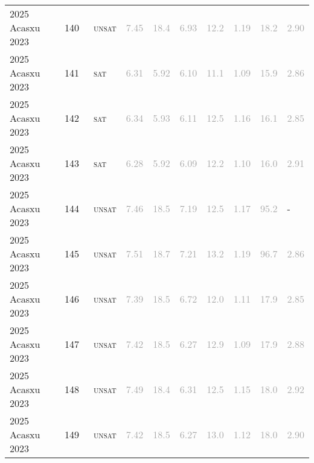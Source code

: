\begin{center}
{\begin{longtable}{@{}llllllllll@{}}
2025 Acasxu 2023 & 140 & ~\textsc{unsat} & \textcolor{darkgray}{7.45} & \textcolor{darkgray}{18.4} & \textcolor{darkgray}{6.93} & \textcolor{darkgray}{12.2} & \textcolor{darkgray}{1.19} & \textcolor{darkgray}{18.2} & \textcolor{darkgray}{2.90} \\
2025 Acasxu 2023 & 141 & ~\textsc{sat} & \textcolor{darkgray}{6.31} & \textcolor{darkgray}{5.92} & \textcolor{darkgray}{6.10} & \textcolor{darkgray}{11.1} & \textcolor{darkgray}{1.09} & \textcolor{darkgray}{15.9} & \textcolor{darkgray}{2.86} \\
2025 Acasxu 2023 & 142 & ~\textsc{sat} & \textcolor{darkgray}{6.34} & \textcolor{darkgray}{5.93} & \textcolor{darkgray}{6.11} & \textcolor{darkgray}{12.5} & \textcolor{darkgray}{1.16} & \textcolor{darkgray}{16.1} & \textcolor{darkgray}{2.85} \\
2025 Acasxu 2023 & 143 & ~\textsc{sat} & \textcolor{darkgray}{6.28} & \textcolor{darkgray}{5.92} & \textcolor{darkgray}{6.09} & \textcolor{darkgray}{12.2} & \textcolor{darkgray}{1.10} & \textcolor{darkgray}{16.0} & \textcolor{darkgray}{2.91} \\
2025 Acasxu 2023 & 144 & ~\textsc{unsat} & \textcolor{darkgray}{7.46} & \textcolor{darkgray}{18.5} & \textcolor{darkgray}{7.19} & \textcolor{darkgray}{12.5} & \textcolor{darkgray}{1.17} & \textcolor{darkgray}{95.2} & - \\
2025 Acasxu 2023 & 145 & ~\textsc{unsat} & \textcolor{darkgray}{7.51} & \textcolor{darkgray}{18.7} & \textcolor{darkgray}{7.21} & \textcolor{darkgray}{13.2} & \textcolor{darkgray}{1.19} & \textcolor{darkgray}{96.7} & \textcolor{darkgray}{2.86} \\
2025 Acasxu 2023 & 146 & ~\textsc{unsat} & \textcolor{darkgray}{7.39} & \textcolor{darkgray}{18.5} & \textcolor{darkgray}{6.72} & \textcolor{darkgray}{12.0} & \textcolor{darkgray}{1.11} & \textcolor{darkgray}{17.9} & \textcolor{darkgray}{2.85} \\
2025 Acasxu 2023 & 147 & ~\textsc{unsat} & \textcolor{darkgray}{7.42} & \textcolor{darkgray}{18.5} & \textcolor{darkgray}{6.27} & \textcolor{darkgray}{12.9} & \textcolor{darkgray}{1.09} & \textcolor{darkgray}{17.9} & \textcolor{darkgray}{2.88} \\
2025 Acasxu 2023 & 148 & ~\textsc{unsat} & \textcolor{darkgray}{7.49} & \textcolor{darkgray}{18.4} & \textcolor{darkgray}{6.31} & \textcolor{darkgray}{12.5} & \textcolor{darkgray}{1.15} & \textcolor{darkgray}{18.0} & \textcolor{darkgray}{2.92} \\
2025 Acasxu 2023 & 149 & ~\textsc{unsat} & \textcolor{darkgray}{7.42} & \textcolor{darkgray}{18.5} & \textcolor{darkgray}{6.27} & \textcolor{darkgray}{13.0} & \textcolor{darkgray}{1.12} & \textcolor{darkgray}{18.0} & \textcolor{darkgray}{2.90} \\

\end{longtable}}
\end{center}
